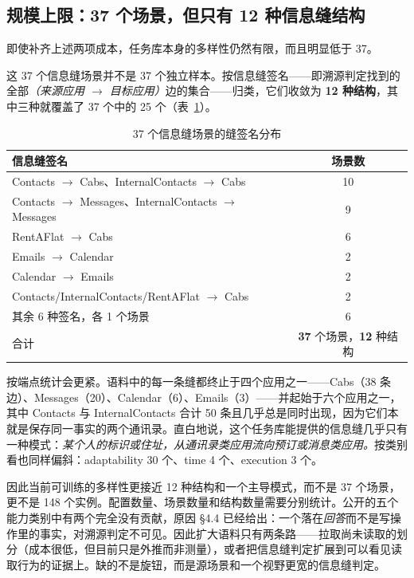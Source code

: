 \documentclass[UTF8,11pt,fontset=fandol]{ctexart}
\begin{document}
\subsection{规模上限：37 个场景，但只有 12 种信息缝结构}

即使补齐上述两项成本，任务库本身的多样性仍然有限，而且明显低于 37。

这 37 个信息缝场景并不是 37 个独立样本。按信息缝签名——即溯源判定找到的全部\emph{（来源应用 $\rightarrow$ 目标应用）}边的集合——归类，它们收敛为 \textbf{12 种结构}，其中三种就覆盖了 37 个中的 25 个（表~\ref{tab:combos}）。

\begin{table}[H]
\centering
\small
\caption{37 个信息缝场景的缝签名分布}
\label{tab:combos}
\begin{tabularx}{\textwidth}{X c}
\toprule
信息缝签名 & 场景数\\
\midrule
Contacts $\rightarrow$ Cabs、InternalContacts $\rightarrow$ Cabs & 10\\
Contacts $\rightarrow$ Messages、InternalContacts $\rightarrow$ Messages & 9\\
RentAFlat $\rightarrow$ Cabs & 6\\
Emails $\rightarrow$ Calendar & 2\\
Calendar $\rightarrow$ Emails & 2\\
Contacts/InternalContacts/RentAFlat $\rightarrow$ Cabs & 2\\
其余 6 种签名，各 1 个场景 & 6\\
\midrule
合计 & \textbf{37} 个场景，\textbf{12} 种结构\\
\bottomrule
\end{tabularx}
\end{table}

按端点统计会更紧。语料中的每一条缝都终止于四个应用之一——Cabs（38 条边）、Messages（20）、Calendar（6）、Emails（3）——并起始于六个应用之一，其中 Contacts 与 InternalContacts 合计 50 条且几乎总是同时出现，因为它们本就是保存同一事实的两个通讯录。直白地说，这个任务库能提供的信息缝几乎只有一种模式：\emph{某个人的标识或住址，从通讯录类应用流向预订或消息类应用。}按类别看也同样偏斜：adaptability 30 个、time 4 个、execution 3 个。

因此当前可训练的多样性更接近 12 种结构和一个主导模式，而不是 37 个场景，更不是 148 个实例。配置数量、场景数量和结构数量需要分别统计。公开的五个能力类别中有两个完全没有贡献，原因 \S4.4 已经给出：一个落在\emph{回答}而不是写操作里的事实，对溯源判定不可见。因此扩大语料只有两条路——拉取尚未读取的划分（成本很低，但目前只是外推而非测量），或者把信息缝判定扩展到可以看见读取行为的证据上。缺的不是旋钮，而是源场景和一个视野更宽的信息缝判定。
\end{document}
